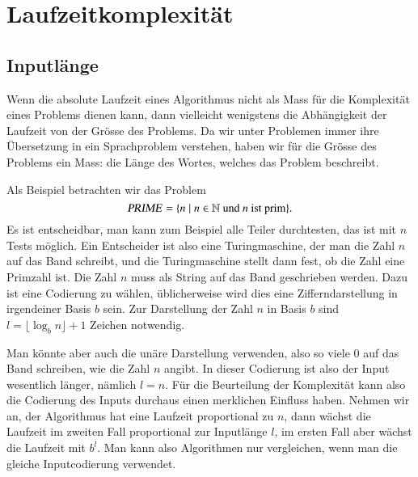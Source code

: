 %
%
%
\section{Laufzeitkomplexität}
%
\subsection{Inputlänge}
%
Wenn die absolute Laufzeit eines Algorithmus nicht als Mass für
die Komplexität eines Problems dienen kann, dann vielleicht
wenigstens die Abhängigkeit der Laufzeit von der Grösse des
Problems. Da wir unter Problemen immer ihre Übersetzung in ein
Sprachproblem verstehen, haben wir für die Grösse des Problems
ein Mass: die Länge des Wortes, welches das Problem beschreibt.

Als Beispiel betrachten wir das Problem
%
\[
\text{\textsl{PRIME}}=\{ n\;|\; \text{$n\in\mathbb N$ und $n$ ist prim}\}.
\]
Es ist entscheidbar, man kann zum Beispiel alle Teiler durchtesten,
das ist mit $n$ Tests möglich. Ein Entscheider ist also eine Turingmaschine,
der man die Zahl $n$ auf das Band schreibt, und die Turingmaschine
stellt dann fest, ob die Zahl eine Primzahl ist. Die Zahl $n$ muss
als String auf das Band geschrieben werden. Dazu ist eine Codierung
zu wählen, üblicherweise wird dies eine Zifferndarstellung in
irgendeiner Basis $b$ sein. Zur Darstellung der Zahl $n$ in Basis $b$
sind $l=\lfloor \log_bn\rfloor+1$ Zeichen notwendig.

Man könnte aber auch die unäre Darstellung verwenden, also so viele
$0$ auf das Band schreiben, wie die Zahl $n$ angibt. In dieser Codierung
ist also der Input wesentlich länger, nämlich $l=n$.
Für die Beurteilung der
Komplexität kann also die Codierung des Inputs durchaus einen
merklichen Einfluss haben. Nehmen wir an, der Algorithmus hat
eine Laufzeit proportional zu $n$, dann wächst die Laufzeit im
zweiten Fall proportional zur Inputlänge $l$, im ersten Fall
aber wächst die Laufzeit mit $b^l$. Man kann also Algorithmen
nur vergleichen, wenn man die gleiche Inputcodierung verwendet.

